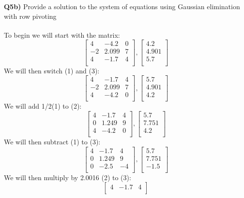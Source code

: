 \documentclass[12pt]{article}
\begin{document}
\begin{adjustwidth}{0em}{0pt}
\textbf{Q5b)} Provide a solution to the system of equations using Gaussian elimination with row pivoting \\\\
To begin we will start with the matrix:
\[ 
\begin{bmatrix}
4 & -4.2 & 0\\
-2 & 2.099 & 7 \\
4 & -1.7 & 4 \\
\end{bmatrix}, \begin{bmatrix}
4.2 \\
4.901 \\
5.7 \\
\end{bmatrix}\]
We will then switch (1) and (3):
\[ 
\begin{bmatrix}
4 & -1.7 & 4 \\
-2 & 2.099 & 7 \\
4 & -4.2 & 0\\
\end{bmatrix}, \begin{bmatrix}
5.7 \\
4.901 \\
4.2 \\
\end{bmatrix}\]
We will add 1/2(1) to (2):
\[ 
\begin{bmatrix}
4 & -1.7 & 4 \\
0 & 1.249 & 9 \\
4 & -4.2 & 0\\
\end{bmatrix}, \begin{bmatrix}
5.7 \\
7.751 \\
4.2 \\
\end{bmatrix}\]
We will then subtract (1) to (3):
\[ 
\begin{bmatrix}
4 & -1.7 & 4 \\
0 & 1.249 & 9 \\
0 & -2.5 & -4\\
\end{bmatrix}, \begin{bmatrix}
5.7 \\
7.751 \\
-1.5 \\
\end{bmatrix}\]
We will then multiply by 2.0016 (2) to (3):
\[ 
\begin{bmatrix}
4 & -1.7 & 4 \\

\end{bmatrix}\]
\end{adjustwidth}
\end{document}
